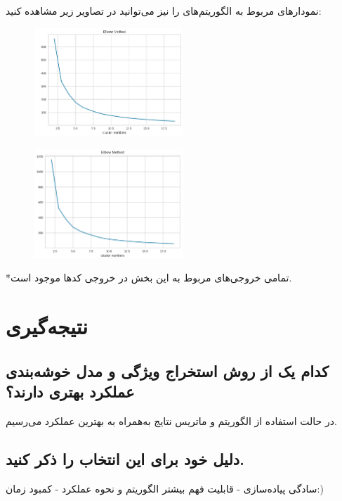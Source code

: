 \documentclass{article}
\begin{document}
\newpage
نمودارهای  مربوط به الگوریتم‌های  را نیز می‌توانید در تصاویر زیر مشاهده کنید:
\begin{figure}[ht]
        \centering
        \includegraphics[width=0.5\textwidth]{kmeans-tfidf-elbow.png}
        \caption{}
        \label{fig:fig10}
\end{figure}

\begin{figure}[ht]
        \centering
        \includegraphics[width=0.5\textwidth]{kmeans-bow-elbow.png}
        \caption{}
        \label{fig:fig11}
\end{figure}
*تمامی خروجی‌های مربوط به این بخش در خروجی کدها موجود است.

\newpage
\section{نتیجه‌گیری}
\subsection{کدام یک از روش استخراج ویژگی و مدل خوشه‌بندی عملکرد بهتری دارند؟}
در حالت استفاده از الگوریتم  و ماتریس نتایج  به‌همراه  به بهترین عملکرد می‌رسیم.
\subsection{دلیل خود برای این انتخاب را ذکر کنید.}
سادگی پیاده‌سازی - قابلیت فهم بیشتر الگوریتم و نحوه عملکرد - کمبود زمان:)
\newpage
\end{document}
